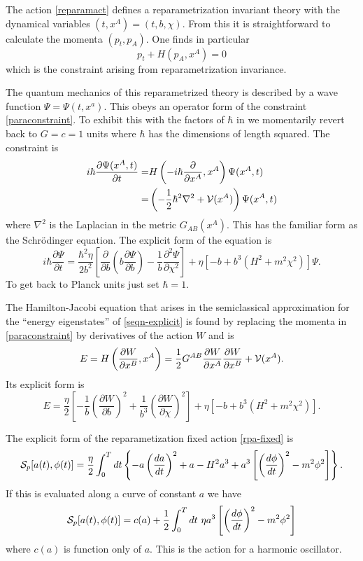 \documentclass[prd,floats,superscriptaddress,eqsecnum,floatfix,nofootinbib,12pt]{revtex4}
\def\ah{a}
\def\phih{\phi}
\def\be{\begin{equation}}
\def\ee{\end{equation}}
\def\cV{{\cal V}}
\begin{document}
{{{{The action \eqref{reparamact} defines a reparametrization invariant theory with the dynamical variables $(t,x^A)=(t,b,\chi)$. From this it is straightforward to calculate the momenta $(p_t, p_A)$. One finds in particular
\be
\label{paraconstraint}
p_t +  H(p_A,x^A) = 0
\ee
which is the constraint arising from reparametrization invariance. 

The quantum mechanics  of this reparametrized theory is described by a wave function $\Psi=\Psi(t,x^a)$. This obeys an operator form of the constraint \eqref{paraconstraint}. To exhibit this with the factors of $\hbar$ in we momentarily revert back to $G=c=1$ units where $\hbar$ has the dimensions of length squared. The constraint is
\begin{align}
\label{seqn1}
i\hbar\frac{\partial\Psi(x^A,t)}{\partial t} =& 
H\left(-i\hbar\frac{\partial}{\partial x^A},x^A\right)\Psi(x^A,t)  \nonumber \\ 
=&\left(-\frac{1}{2} \hbar^2 \nabla^2 +\cV(x^A) \right)\Psi(x^A,t) 
\end{align}
where $\nabla^2$ is the Laplacian in the metric $G_{AB}(x^A)$.
This has the familiar form as the Schr\"odinger equation.  The explicit form of the equation is
\be
\label{seqn-explicit}
i\hbar\frac{\partial\Psi}{\partial t} = \frac{\hbar^2\eta}{2b^2}\left[\frac{\partial}{\partial b}\left(b\frac{\partial\Psi}{\partial b}\right)-\frac{1}{b}\frac{\partial^2\Psi}{\partial\chi^2}\right]+\eta\left[-b+b^3(H^2 + m^2\chi^2)\right] \Psi .
\ee
To get back to Planck units just set $\hbar=1$.

The Hamilton-Jacobi equation that arises in the semiclassical approximation for the ``energy eigenstates'' of \eqref{seqn-explicit} is found by replacing the momenta in \eqref{paraconstraint} by derivatives of the action $W$ and is
\be 
E=H\left(\frac{\partial W}{\partial x^B}, x^A\right)=\frac{1}{2}G^{AB}\frac{\partial W}{\partial x^A}\frac{\partial W}{\partial x^B} +\cV(x^A) .
\label{HJ}
\ee
Its explicit form is 
\be
E= \frac{\eta}{2}\left[-\frac{1}{b}\left(\frac{\partial W}{\partial b}\right)^2+\frac{1}{b^3}\left(\frac{\partial W}{\partial\chi}\right)^2\right]+\eta\left[-b+b^3(H^2 + m^2\chi^2)\right] .
\label{HJ-explicit}
\ee

The explicit form of the reparametization fixed action \eqref{rpa-fixed} is 
\begin{equation} 
{\cal  S}_p[\ah(t),\phih(t)] = \frac{\eta}{2}\int_0^T dt \left\{ -\ah \left(\frac{da}{dt}\right)^2 +\ah -H^2\ah^3 +\ah^3\left[\left(\frac{d\phi}{dt}\right)^2 - m^2\phih^2\right]\right\}.
\label{loract-fixed}
\end{equation}
If this is evaluated along a curve of constant $a$ we have
\be
{\cal  S}_p [a(t),\phi(t)]= c(a) + \frac{1}{2}\int_0^T  dt \  \eta a^3\left[\left(\frac{d\phi}{dt}\right)^2 - m^2\phih^2\right]
\label{ho}
\ee
where $c(a)$ is function only of $a$. This is the action for a harmonic oscillator. 

}}}}
\end{document}
